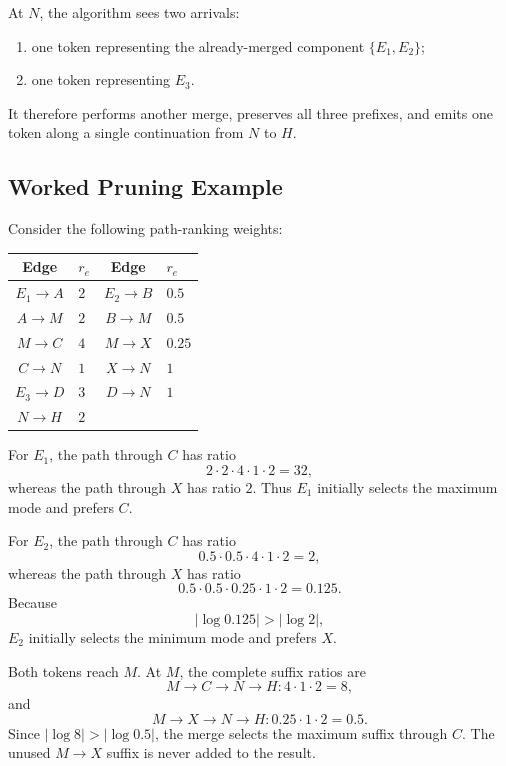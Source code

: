 \documentclass[11pt]{article}
\begin{document}
At \(N\), the algorithm sees two arrivals:

\begin{enumerate}
    \item one token representing the already-merged component
          \(\{E_1,E_2\}\);
    \item one token representing \(E_3\).
\end{enumerate}

It therefore performs another merge, preserves all three prefixes, and emits
one token along a single continuation from \(N\) to \(H\).

\subsection{Worked Pruning Example}

Consider the following path-ranking weights:

\begin{center}
\begin{tabular}{cl@{\qquad}cl}
\toprule
Edge & \(r_e\) & Edge & \(r_e\) \\
\midrule
\(E_1\to A\) & \(2\)       & \(E_2\to B\) & \(0.5\) \\
\(A\to M\)   & \(2\)       & \(B\to M\)   & \(0.5\) \\
\(M\to C\)   & \(4\)       & \(M\to X\)   & \(0.25\) \\
\(C\to N\)   & \(1\)       & \(X\to N\)   & \(1\) \\
\(E_3\to D\) & \(3\)       & \(D\to N\)   & \(1\) \\
\(N\to H\)   & \(2\)       &                 & \\
\bottomrule
\end{tabular}
\end{center}

For \(E_1\), the path through \(C\) has ratio
\[
    2\cdot 2\cdot 4\cdot 1\cdot 2=32,
\]
whereas the path through \(X\) has ratio \(2\).  Thus \(E_1\) initially
selects the maximum mode and prefers \(C\).

For \(E_2\), the path through \(C\) has ratio
\[
    0.5\cdot 0.5\cdot 4\cdot 1\cdot 2=2,
\]
whereas the path through \(X\) has ratio
\[
    0.5\cdot 0.5\cdot 0.25\cdot 1\cdot 2=0.125.
\]
Because
\[
    |\log 0.125|>|\log 2|,
\]
\(E_2\) initially selects the minimum mode and prefers \(X\).

Both tokens reach \(M\).  At \(M\), the complete suffix ratios are
\[
    M\to C\to N\to H: 4\cdot 1\cdot 2=8,
\]
and
\[
    M\to X\to N\to H: 0.25\cdot 1\cdot 2=0.5.
\]
Since \(|\log 8|>|\log 0.5|\), the merge selects the maximum suffix through
\(C\).  The unused \(M\to X\) suffix is never added to the result.
\end{document}
